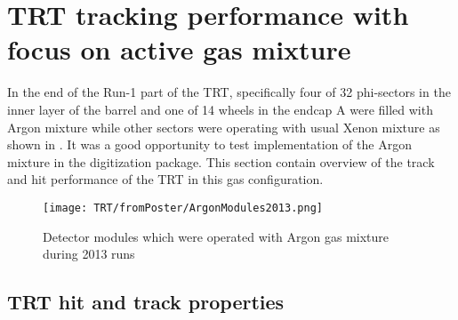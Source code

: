 \section{TRT tracking performance with focus on active gas mixture}
\label{sec:digi_argon}

In the end of the Run-1 part of the TRT, specifically
four of 32 phi-sectors in the inner layer of the barrel and one of 14 wheels in the endcap A were filled with Argon mixture while other sectors were operating 
with usual Xenon mixture as shown in .
It was a good opportunity to test implementation of the Argon mixture in the digitization package.
This section contain overview of the track and hit performance of the TRT in this gas configuration.

\begin{figure}
\begin{center}
 \texttt{[image: TRT/fromPoster/ArgonModules2013.png]}
\caption{Detector modules which were operated with Argon gas mixture during 2013 runs}
\label{fig:argonModulesIn2013}
\end{center}
\end{figure}

\subsection{TRT hit and track properties}

